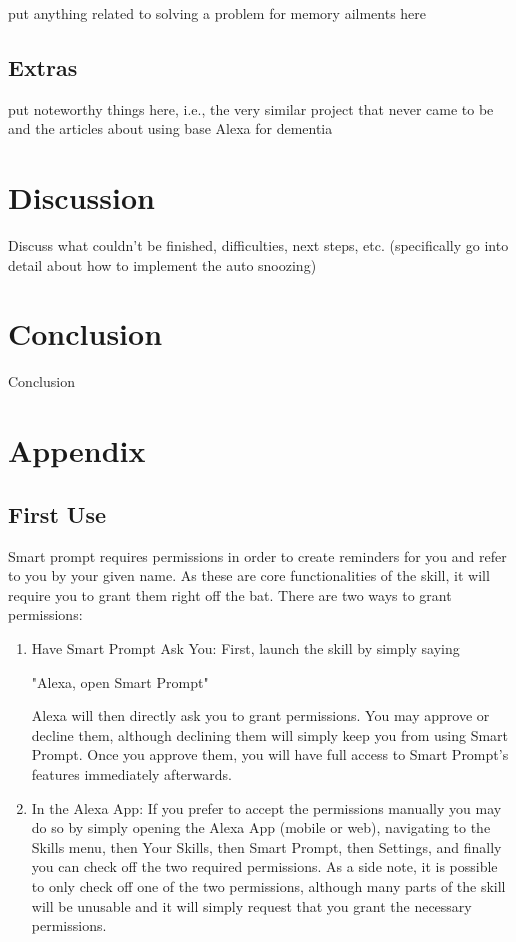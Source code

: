 \documentclass[11pt, oneside]{article}
\begin{document}
put anything related to solving a problem for memory ailments here

\subsection{Extras}

put noteworthy things here, i.e., the very similar project that never came to be and the articles about using base Alexa for dementia


\section{Discussion}

Discuss what couldn't be finished, difficulties, next steps, etc. (specifically go into detail about how to implement the auto snoozing)


\section{Conclusion}

Conclusion


\section{Appendix}

\subsection{First Use}

Smart prompt requires permissions in order to create reminders for you and refer to you by your given name. As these are core functionalities of the skill, it will require you to grant them right off the bat.
There are two ways to grant permissions:

\begin{enumerate}
  \item Have Smart Prompt Ask You:
First, launch the skill by simply saying
\begin{center}
"Alexa, open Smart Prompt"
\end{center}
Alexa will then directly ask you to grant permissions. You may approve or decline them, although declining them will simply keep you from using Smart Prompt. Once you approve them, you will have full access to Smart Prompt's features immediately afterwards.
  \item In the Alexa App:
If you prefer to accept the permissions manually you may do so by simply opening the Alexa App (mobile or web), navigating to the Skills menu, then Your Skills, then Smart Prompt, then Settings, and finally you can check off the two required permissions.
As a side note, it is possible to only check off one of the two permissions, although many parts of the skill will be unusable and it will simply request that you grant the necessary permissions.
\end{enumerate}
\end{document}
